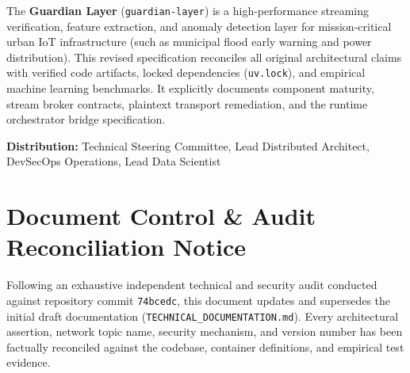 \documentclass[10pt,a4paper]{report}
\begin{document}
\begin{titlepage}
\begin{center}
\begin{tcolorbox}[colback=gray!5!white,colframe=gray!70!black,title=\textbf{Engineering Baseline Summary},arc=2mm]
The \textbf{Guardian Layer} (\texttt{guardian-layer}) is a high-performance streaming verification, feature extraction, and anomaly detection layer for mission-critical urban IoT infrastructure (such as municipal flood early warning and power distribution). This revised specification reconciles all original architectural claims with verified code artifacts, locked dependencies (\texttt{uv.lock}), and empirical machine learning benchmarks. It explicitly documents component maturity, stream broker contracts, plaintext transport remediation, and the runtime orchestrator bridge specification.
\end{tcolorbox}

\vspace{0.8cm}
{\small \textbf{Distribution:} Technical Steering Committee, Lead Distributed Architect, DevSecOps Operations, Lead Data Scientist}
\end{center}
\end{titlepage}

\tableofcontents
\newpage

\chapter*{Document Control \& Audit Reconciliation Notice}

Following an exhaustive independent technical and security audit conducted against repository commit \texttt{74bcedc}, this document updates and supersedes the initial draft documentation (\texttt{TECHNICAL\_DOCUMENTATION.md}). Every architectural assertion, network topic name, security mechanism, and version number has been factually reconciled against the codebase, container definitions, and empirical test evidence.
\end{document}

